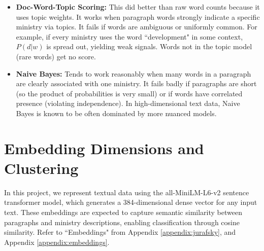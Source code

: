 \documentclass{report}
\begin{document}
\begin{itemize}
    \item \textbf{Doc-Word-Topic Scoring:} This did better than raw word counts because it uses topic weights. It works when paragraph words strongly indicate a specific ministry via topics. It fails if words are ambiguous or uniformly common. For example, if every ministry uses the word ``development" in some context, $P(d|w)$ is spread out, yielding weak signals. Words not in the topic model (rare words) get no score.
    \item \textbf{Naive Bayes:} Tends to work reasonably when many words in a paragraph are clearly associated with one ministry. It fails badly if paragraphs are short (so the product of probabilities is very small) or if words have correlated presence (violating independence)\cite{Rennie2003}. In high-dimensional text data, Naive Bayes is known to be often dominated by more nuanced models.
\end{itemize}

\section{Embedding Dimensions and Clustering}
In this project, we represent textual data using the all-MiniLM-L6-v2 sentence transformer model, which generates a 384-dimensional dense vector for any input text. These embeddings are expected to capture semantic similarity between paragraphs and ministry descriptions, enabling classification through cosine similarity. Refer to ``Embeddings" from Appendix \ref{appendix:jurafsky}, and Appendix \ref{appendix:embeddings}.
\end{document}
